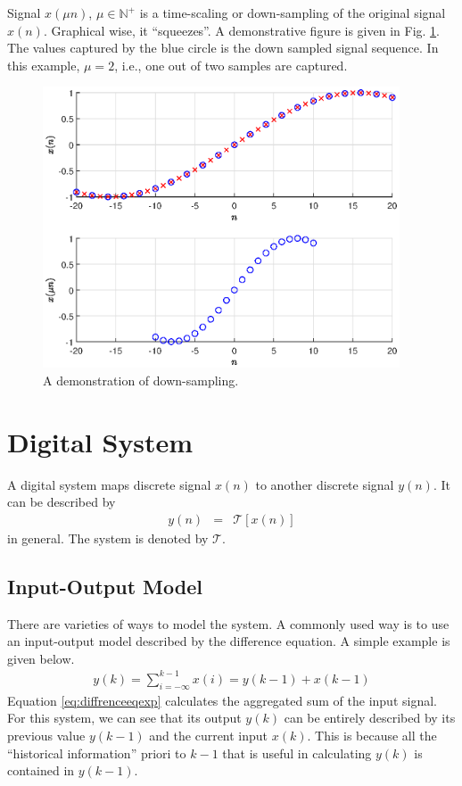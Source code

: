 Signal $x(\mu n)$, $\mu \in \mathbb{N}^+$ is a time-scaling or down-sampling of the original signal $x(n)$. Graphical wise, it ``squeezes''. A demonstrative figure is given in Fig. \ref{fig:downsampling}. The values captured by the blue circle is the down sampled signal sequence. In this example, $\mu=2$, i.e., one out of two samples are captured.
\begin{figure}
	\centering
	\includegraphics[width=300pt]{chapters/ch-signal-processing/figures/downsampling.eps}
	\caption{A demonstration of down-sampling.} \label{fig:downsampling}
\end{figure}

\section{Digital System}

A digital system maps discrete signal $x(n)$ to another discrete signal $y(n)$. It can be described by
\begin{eqnarray}
	y(n) &=& \mathcal{T}[x(n)] \nonumber
\end{eqnarray}
in general. The system is denoted by $\mathcal{T}$.

\subsection{Input-Output Model}

There are varieties of ways to model the system. A commonly used way is to use an input-output model described by the difference equation. A simple example is given below.
\begin{eqnarray}
	y(k) = \sum_{i=-\infty}^{k-1}x(i) = y(k-1) + x(k-1) \label{eq:diffrenceeqexp}
\end{eqnarray}
Equation \eqref{eq:diffrenceeqexp} calculates the aggregated sum of the input signal. For this system, we can see that its output $y(k)$ can be entirely described by its previous value $y(k-1)$ and the current input $x(k)$. This is because all the ``historical information'' priori to $k-1$ that is useful in calculating $y(k)$ is contained in $y(k-1)$. 

